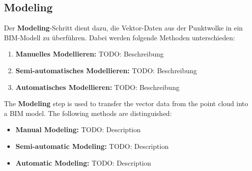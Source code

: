 \subsection{Modeling}
\begin{German}
    Der \textbf{Modeling}-Schritt dient dazu, die Vektor-Daten aus der Punktwolke in ein BIM-Modell zu überführen. Dabei werden folgende Methoden unterschieden:

    \begin{enumerate}
        \item \textbf{Manuelles Modellieren:} TODO: Beschreibung
        \item \textbf{Semi-automatisches Modellieren:} TODO: Beschreibung
        \item \textbf{Automatisches Modellieren:} TODO: Beschreibung
    \end{enumerate}
\end{German}

\begin{English}
    The \textbf{Modeling} step is used to transfer the vector data from the point cloud into a BIM model. The following methods are distinguished:

    \begin{itemize}
        \item \textbf{Manual Modeling:} TODO: Description
        \item \textbf{Semi-automatic Modeling:} TODO: Description
        \item \textbf{Automatic Modeling:} TODO: Description
    \end{itemize}
\end{English}